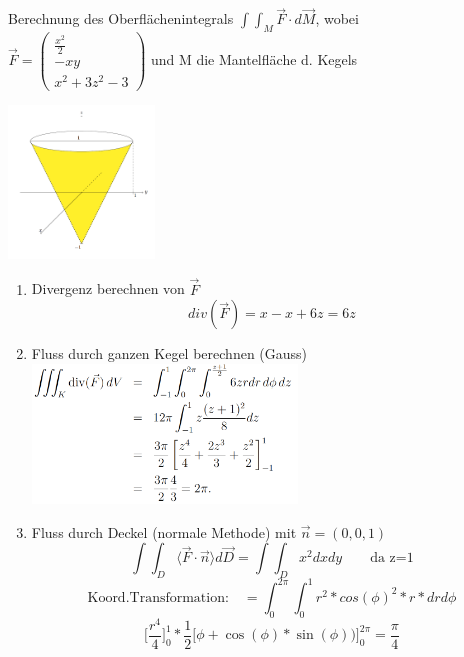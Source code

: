 \documentclass[6pt]{article}
\begin{document}
\begin{multicols*}{3}
		Berechnung des Oberfl{\"a}chenintegrals $\int \int_{M} \vec{F} \cdot d\vec{M}$, wobei \vspace{2mm}\\ 
			$\vec{F} = 
			\begin{pmatrix}
			\frac{x^2}{2} \\ -xy \\ x^2 + 3z^2 -3 
			\end{pmatrix} $ und M die Mantelfl{\"a}che d. Kegels	
				
		\vspace{-4mm}		
		\begin{center}
				\includegraphics[width=110pt]{images/kegelaufgabe1}
		\end{center}
		
		\begin{enumerate}[label=(\roman*)]
				\item Divergenz berechnen von $\vec{F}$ \\
				\[
						div(\vec{F}) = x - x + 6z = 6z
				\]
				
				\item Fluss durch ganzen Kegel berechnen (Gauss) \\
						\includegraphics[width=200pt]{images/kegelaufgabe2}

				\item Fluss durch Deckel (normale Methode) mit $\vec{n} = (0, 0, 1)$
						\[
								\int \int_{D} \langle \vec{F} \cdot \vec{n} \rangle d\vec{D} =  \int \int_{D}  x^2 dx dy \qquad \text{da z=1}
						\]
						\[
								\text{Koord.Transformation:} \quad  = \int_{0}^{2\pi} \int_{0}^{1} r^2 * cos(\phi)^2 * r * dr d\phi
						\]
						\[
								\bigg\lbrack \frac{r^4}{4}\bigg\rbrack_{0}^{1} * \frac{1}{2} \bigg\lbrack\phi + \cos(\phi) * \sin(\phi)) \bigg\rbrack_{0}^{2\pi} = \frac{\pi}{4}
						\]


\end{enumerate}
\end{multicols*}
\end{document}
